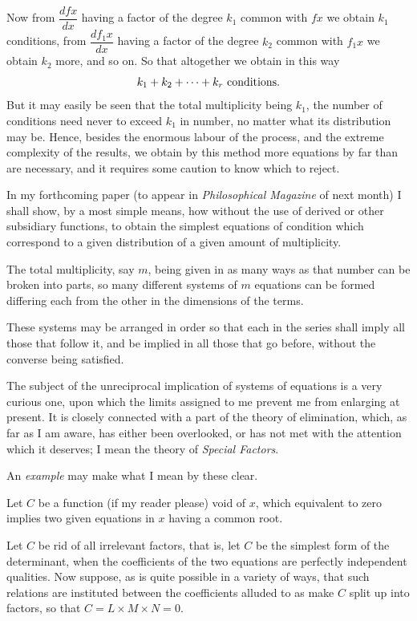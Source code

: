 \documentclass[11pt]{article}
\newcommand{\sourcepage}[1]{\marginpar{\scriptsize p.~#1}}
\begin{document}
Now from $\dfrac{dfx}{dx}$ having a factor of the degree $k_1$ common with $fx$ we obtain $k_1$ conditions, from $\dfrac{df_1x}{dx}$ having a factor of the degree $k_2$ common with $f_1x$ we obtain $k_2$ more, and so on. So that altogether we obtain in this way
\[
 k_1+k_2+\cdots+k_r \hbox{ conditions.}
\]
But it may easily be seen that the total multiplicity being $k_1$, the number of conditions need never to exceed $k_1$ in number, no matter what its distribution may be. Hence, besides the enormous labour of the process, and the extreme complexity of the results, we obtain by this method more equations by far than are necessary, and it requires some caution to know which to reject.

In my forthcoming paper (to appear in \emph{Philosophical Magazine} of next month) I shall show, by a most simple means, how without the use of derived or other subsidiary functions, to obtain the simplest equations of condition which correspond to a given distribution of a given amount of multiplicity.

The total multiplicity, say $m$, being given in as many ways as that number can be broken into parts, so many different systems of $m$ equations can be formed differing each from the other in the dimensions of the terms.

\sourcepage{68}
These systems may be arranged in order so that each in the series shall imply all those that follow it, and be implied in all those that go before, without the converse being satisfied.

The subject of the unreciprocal implication of systems of equations is a very curious one, upon which the limits assigned to me prevent me from enlarging at present. It is closely connected with a part of the theory of elimination, which, as far as I am aware, has either been overlooked, or has not met with the attention which it deserves; I mean the theory of \emph{Special Factors}.

An \emph{example} may make what I mean by these clear.

Let $C$ be a function (if my reader please) void of $x$, which equivalent to zero implies two given equations in $x$ having a common root.

Let $C$ be rid of all irrelevant factors, that is, let $C$ be the simplest form of the determinant, when the coefficients of the two equations are perfectly independent qualities. Now suppose, as is quite possible in a variety of ways, that such relations are instituted between the coefficients alluded to as make $C$ split up into factors, so that $C=L\times M\times N=0$.
\end{document}
